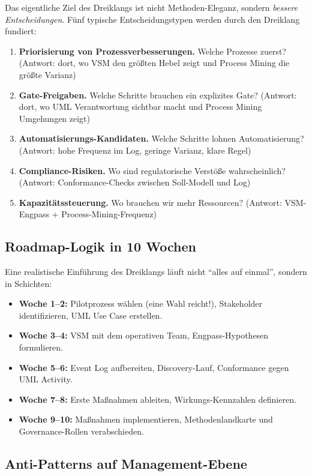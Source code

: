 \documentclass[11pt,a4paper,oneside]{article}
\begin{document}
Das eigentliche Ziel des Dreiklangs ist nicht Methoden-Eleganz, sondern \emph{bessere Entscheidungen}. Fünf typische Entscheidungstypen werden durch den Dreiklang fundiert:

\begin{enumerate}
  \item \textbf{Priorisierung von Prozessverbesserungen.} Welche Prozesse zuerst? (Antwort: dort, wo VSM den größten Hebel zeigt und Process Mining die größte Varianz)
  \item \textbf{Gate-Freigaben.} Welche Schritte brauchen ein explizites Gate? (Antwort: dort, wo UML Verantwortung sichtbar macht und Process Mining Umgehungen zeigt)
  \item \textbf{Automatisierungs-Kandidaten.} Welche Schritte lohnen Automatisierung? (Antwort: hohe Frequenz im Log, geringe Varianz, klare Regel)
  \item \textbf{Compliance-Risiken.} Wo sind regulatorische Verstöße wahrscheinlich? (Antwort: Conformance-Checks zwischen Soll-Modell und Log)
  \item \textbf{Kapazitätssteuerung.} Wo brauchen wir mehr Ressourcen? (Antwort: VSM-Engpass + Process-Mining-Frequenz)
\end{enumerate}

\subsection{Roadmap-Logik in 10 Wochen}

Eine realistische Einführung des Dreiklangs läuft nicht ``alles auf einmal'', sondern in Schichten:

\begin{itemize}
  \item \textbf{Woche 1--2:} Pilotprozess wählen (eine Wahl reicht!), Stakeholder identifizieren, UML Use Case erstellen.
  \item \textbf{Woche 3--4:} VSM mit dem operativen Team, Engpass-Hypothesen formulieren.
  \item \textbf{Woche 5--6:} Event Log aufbereiten, Discovery-Lauf, Conformance gegen UML Activity.
  \item \textbf{Woche 7--8:} Erste Maßnahmen ableiten, Wirkungs-Kennzahlen definieren.
  \item \textbf{Woche 9--10:} Maßnahmen implementieren, Methodenlandkarte und Governance-Rollen verabschieden.
\end{itemize}

\subsection{Anti-Patterns auf Management-Ebene}
\end{document}
